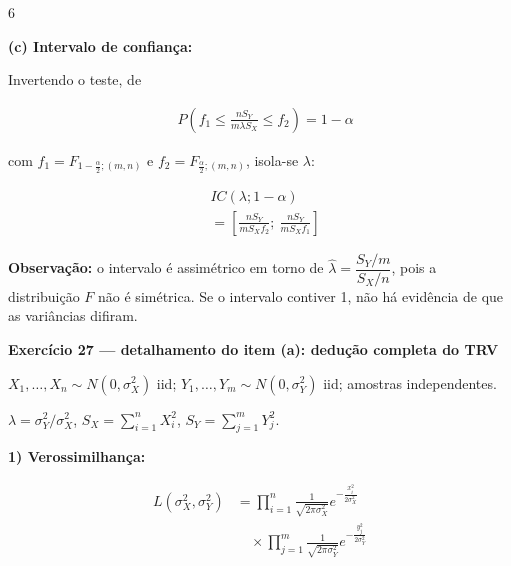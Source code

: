 \documentclass[8pt, a4paper, landscape]{extarticle}
\begin{document}
\begin{multicols}{6}
\vspace{0.2cm}

\textbf{(c) Intervalo de confiança:}

Invertendo o teste, de

\begin{equation*}
\begin{split}
&P\left(f_1 \leq \frac{nS_Y}{m\lambda S_X} \leq f_2\right) = 1-\alpha
\end{split}
\end{equation*}

com $f_1 = F_{1-\frac{\alpha}{2};(m,n)}$ e $f_2 = F_{\frac{\alpha}{2};(m,n)}$, isola-se $\lambda$:

\begin{equation*}
\begin{split}
&IC(\lambda;1-\alpha) \\
&= \left[\frac{nS_Y}{mS_X f_2};\ \frac{nS_Y}{mS_X f_1}\right]
\end{split}
\end{equation*}

\textbf{Observação:} o intervalo é assimétrico em torno de $\hat{\lambda} = \dfrac{S_Y/m}{S_X/n}$, pois a distribuição $F$ não é simétrica. Se o intervalo contiver 1, não há evidência de que as variâncias difiram.

\textbf{Exercício 27 — detalhamento do item (a): dedução completa do TRV}

\vspace{0.3cm}

$X_1,\dots,X_n \sim N(0,\sigma_X^2)$ iid; \quad $Y_1,\dots,Y_m \sim N(0,\sigma_Y^2)$ iid; amostras independentes.

$\lambda = \sigma_Y^2/\sigma_X^2$, \quad $S_X = \sum_{i=1}^{n} X_i^2$, \quad $S_Y = \sum_{j=1}^{m} Y_j^2$.

\vspace{0.2cm}

\textbf{1) Verossimilhança:}

\begin{equation*}
\begin{split}
L(\sigma_X^2,\sigma_Y^2) &= \prod_{i=1}^{n}\frac{1}{\sqrt{2\pi\sigma_X^2}}e^{-\frac{x_i^2}{2\sigma_X^2}} \\
&\quad \times \prod_{j=1}^{m}\frac{1}{\sqrt{2\pi\sigma_Y^2}}e^{-\frac{y_j^2}{2\sigma_Y^2}}
\end{split}
\end{equation*}


\end{multicols}
\end{document}
